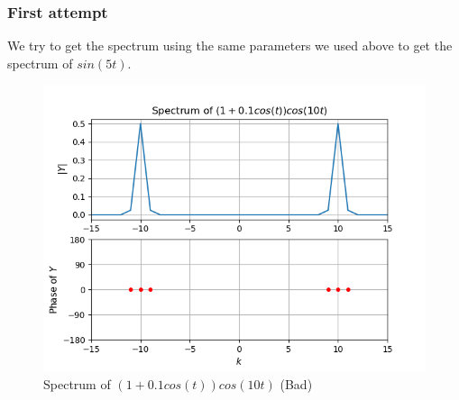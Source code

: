 \documentclass[11pt, a4paper]{article}
\begin{document}
        \subsubsection{First attempt}
        We try to get the spectrum using the same parameters we used above to get the spectrum of $sin(5t)$.
        \begin{figure}[!h]
            \centering
            \includegraphics[scale = 0.66]{Figure 3.png}
            \caption{Spectrum of $(1+0.1cos(t))cos(10t)$ (Bad)}
            \label{fig:Figure 3}
        \end{figure}
        
\end{document}
